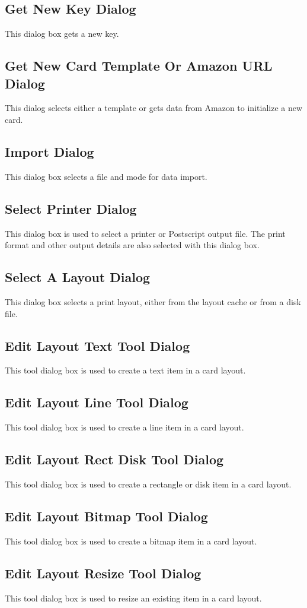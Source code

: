 \subsection{Get New Key Dialog}
This dialog box gets a new key.
\subsection{Get New Card Template Or Amazon URL Dialog}
\label{sect:ref:newcardtempl}
This dialog selects either a template or gets data from Amazon to initialize 
a new card.
\subsection{Import Dialog}
This dialog box selects a file and mode for data import.
\subsection{Select Printer Dialog}
This dialog box is used to select a printer or Postscript output file.
The print format and other output details are also selected with this
dialog box.
\subsection{Select A Layout Dialog}
This dialog box selects a print layout, either from the layout cache or
from a disk file.
\subsection{Edit Layout Text Tool Dialog}
This tool dialog box is used to create a text item in a card layout.
\subsection{Edit Layout Line Tool Dialog}
This tool dialog box is used to create a line item in a card layout.
\subsection{Edit Layout Rect Disk Tool Dialog}
This tool dialog box is used to create a rectangle or disk item in a
card layout.
\subsection{Edit Layout Bitmap Tool Dialog}
This tool dialog box is used to create a bitmap item in a card layout.
\subsection{Edit Layout Resize Tool Dialog}
This tool dialog box is used to resize an existing item in a card layout.

